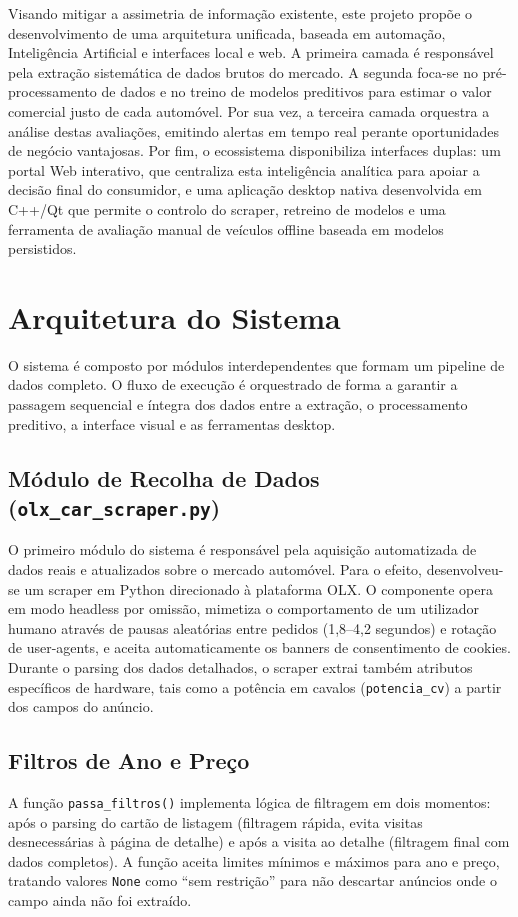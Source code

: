 \documentclass[11pt,a4paper]{article}
\begin{document}
Visando mitigar a assimetria de informação existente, este projeto propõe o desenvolvimento de uma arquitetura unificada, baseada em automação, Inteligência Artificial e interfaces local e web. A primeira camada é responsável pela extração sistemática de dados brutos do mercado. A segunda foca-se no pré-processamento de dados e no treino de modelos preditivos para estimar o valor comercial justo de cada automóvel. Por sua vez, a terceira camada orquestra a análise destas avaliações, emitindo alertas em tempo real perante oportunidades de negócio vantajosas. Por fim, o ecossistema disponibiliza interfaces duplas: um portal Web interativo, que centraliza esta inteligência analítica para apoiar a decisão final do consumidor, e uma aplicação desktop nativa desenvolvida em C++/Qt que permite o controlo do scraper, retreino de modelos e uma ferramenta de avaliação manual de veículos offline baseada em modelos persistidos.

\section{Arquitetura do Sistema}
O sistema é composto por módulos interdependentes que formam um pipeline de dados completo. O fluxo de execução é orquestrado de forma a garantir a passagem sequencial e íntegra dos dados entre a extração, o processamento preditivo, a interface visual e as ferramentas desktop.

\subsection{Módulo de Recolha de Dados (\texttt{olx\_car\_scraper.py})}
O primeiro módulo do sistema é responsável pela aquisição automatizada de dados reais e atualizados sobre o mercado automóvel. Para o efeito, desenvolveu-se um scraper em Python direcionado à plataforma OLX. O componente opera em modo headless por omissão, mimetiza o comportamento de um utilizador humano através de pausas aleatórias entre pedidos (1,8--4,2 segundos) e rotação de user-agents, e aceita automaticamente os banners de consentimento de cookies. Durante o parsing dos dados detalhados, o scraper extrai também atributos específicos de hardware, tais como a potência em cavalos (\texttt{potencia\_cv}) a partir dos campos do anúncio.

\subsection{Filtros de Ano e Preço}
A função \texttt{passa\_filtros()} implementa lógica de filtragem em dois momentos: após o parsing do cartão de listagem (filtragem rápida, evita visitas desnecessárias à página de detalhe) e após a visita ao detalhe (filtragem final com dados completos). A função aceita limites mínimos e máximos para ano e preço, tratando valores \texttt{None} como ``sem restrição'' para não descartar anúncios onde o campo ainda não foi extraído.
\end{document}
